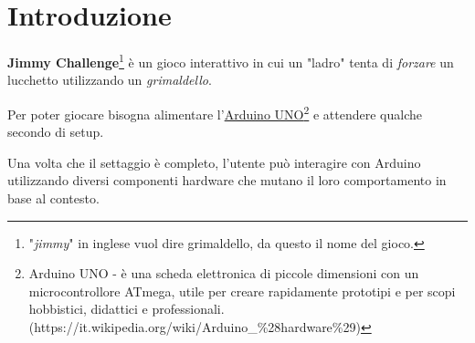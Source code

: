 \chapter{Introduzione}
\textbf{Jimmy Challenge}\footnote{"\textit{jimmy}" in inglese vuol dire grimaldello, da questo il nome del gioco.} è un gioco interattivo in cui un "ladro" tenta di \textit{forzare} un lucchetto utilizzando un \textit{grimaldello}. 

Per poter giocare bisogna alimentare l'\href{https://www.arduino.cc/en/Main/ArduinoBoardUno}{Arduino UNO\footnote{Arduino UNO - è una scheda elettronica di piccole dimensioni con un microcontrollore ATmega, utile per creare rapidamente prototipi e per scopi hobbistici, didattici e professionali. (\url{https://it.wikipedia.org/wiki/Arduino\_\%28hardware\%29})}} e attendere qualche secondo di setup.

Una volta che il settaggio è completo, l'utente può interagire con Arduino utilizzando diversi componenti hardware che mutano il loro comportamento in base al contesto.




